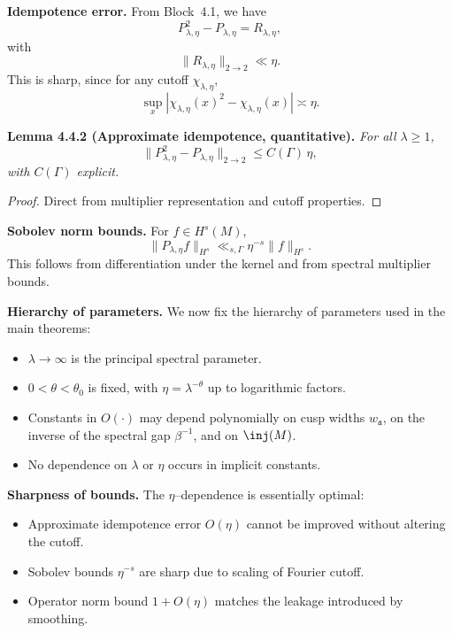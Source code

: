 \medskip

\noindent\textbf{Idempotence error.}
From Block~4.1, we have
\[
  P_{\lambda,\eta}^2 - P_{\lambda,\eta} = R_{\lambda,\eta},
\]
with
\[
  \|R_{\lambda,\eta}\|_{2\to 2} \ll \eta.
\]
This is sharp, since for any cutoff $\chi_{\lambda,\eta}$,
\[
  \sup_{x} |\chi_{\lambda,\eta}(x)^2-\chi_{\lambda,\eta}(x)| \asymp \eta.
\]

\medskip

\noindent\textbf{Lemma 4.4.2 (Approximate idempotence, quantitative).}
\emph{For all $\lambda\ge 1$,}
\[
  \|P_{\lambda,\eta}^2 - P_{\lambda,\eta}\|_{2\to 2} \le C(\Gamma)\,\eta,
\]
\emph{with $C(\Gamma)$ explicit.}

\begin{proof}
Direct from multiplier representation and cutoff properties.
\end{proof}

\medskip

\noindent\textbf{Sobolev norm bounds.}
For $f\in H^s(M)$,
\[
  \|P_{\lambda,\eta} f\|_{H^s} \ll_{s,\Gamma} \eta^{-s}\|f\|_{H^s}.
\]
This follows from differentiation under the kernel and from spectral multiplier bounds.

\medskip

\noindent\textbf{Hierarchy of parameters.}
We now fix the hierarchy of parameters used in the main theorems:
\begin{itemize}
  \item $\lambda\to\infty$ is the principal spectral parameter.
  \item $0<\theta<\theta_0$ is fixed, with $\eta=\lambda^{-\theta}$ up to logarithmic factors.
  \item Constants in $O(\cdot)$ may depend polynomially on cusp widths $w_\mathfrak{a}$,
  on the inverse of the spectral gap $\beta^{-1}$, and on $\inj(M)$.
  \item No dependence on $\lambda$ or $\eta$ occurs in implicit constants.
\end{itemize}

\medskip

\noindent\textbf{Sharpness of bounds.}
The $\eta$–dependence is essentially optimal:
\begin{itemize}
  \item Approximate idempotence error $O(\eta)$ cannot be improved without altering the cutoff.
  \item Sobolev bounds $\eta^{-s}$ are sharp due to scaling of Fourier cutoff.
  \item Operator norm bound $1+O(\eta)$ matches the leakage introduced by smoothing.
\end{itemize}

